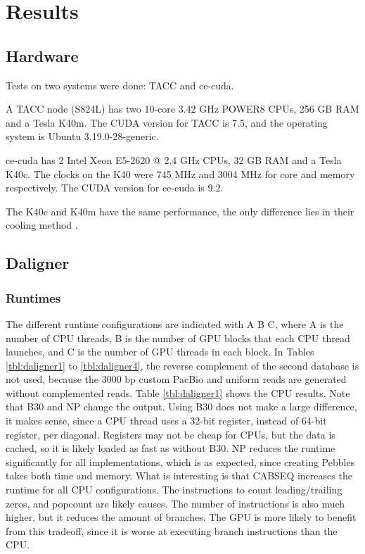 \documentclass[../thesis.tex]{subfiles}
\begin{document}
\chapter{Results}
\ifdefined\main
\newcommand{\codePath}{5_results/code/}
\newcommand{\figPath}{5_results/figures/}
\else

\fi

\section{Hardware}
Tests on two systems were done: TACC \cite{TACC} and ce-cuda.

A TACC node (S824L) has two 10-core 3.42 GHz POWER8 CPUs, 256 GB RAM and a Tesla K40m.
The CUDA version for TACC is 7.5, and the operating system is Ubuntu 3.19.0-28-generic.

ce-cuda has 2 Intel Xeon E5-2620 @ 2.4 GHz CPUs, 32 GB RAM and a Tesla K40c.
The clocks on the K40 were 745 MHz and 3004 MHz for core and memory respectively.
The CUDA version for ce-cuda is 9.2.

The K40c and K40m have the same performance, the only difference lies in their cooling method \cite{K40m}.

\section{Daligner}
\subsection{Runtimes}
The different runtime configurations are indicated with A B C, where A is the number of CPU threads, B is the number of GPU blocks that each CPU thread launches, and C is the number of GPU threads in each block.
In Tables \ref{tbl:daligner1} to \ref{tbl:daligner4}, the reverse complement of the second database is not used, because the 3000 bp custom PacBio and uniform reads are generated without complemented reads.
Table \ref{tbl:daligner1} shows the CPU results.
Note that B30 and NP change the output.
Using B30 does not make a large difference, it makes sense, since a CPU thread uses a 32-bit register, instead of 64-bit register, per diagonal.
Registers may not be cheap for CPUs, but the data is cached, so it is likely loaded as fast as without B30.
NP reduces the runtime significantly for all implementations, which is as expected, since creating Pebbles takes both time and memory.
What is interesting is that CABSEQ increases the runtime for all CPU configurations.
The instructions to count leading/trailing zeros, and popcount are likely causes.
The number of instructions is also much higher, but it reduces the amount of branches.
The GPU is more likely to benefit from this tradeoff, since it is worse at executing branch instructions than the CPU.
\end{document}
